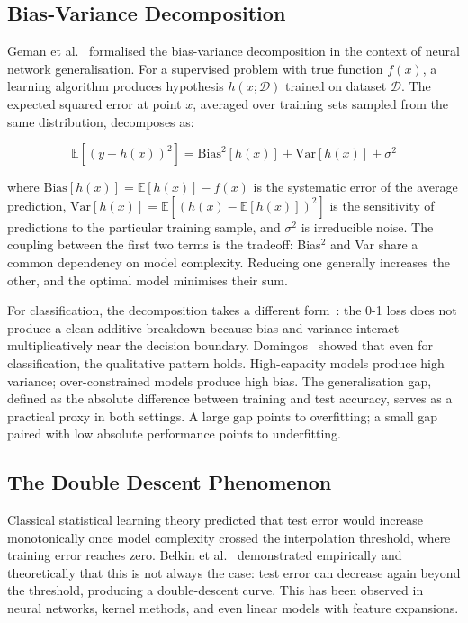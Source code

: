 \documentclass[conference]{IEEEtran}
\begin{document}
\subsection{Bias-Variance Decomposition}

Geman et al.~\cite{b1} formalised the bias-variance decomposition in the context of neural network generalisation. For a supervised problem with true function $f(x)$, a learning algorithm produces hypothesis $h(x; \mathcal{D})$ trained on dataset $\mathcal{D}$. The expected squared error at point $x$, averaged over training sets sampled from the same distribution, decomposes as:

\begin{equation}
\mathbb{E}\left[(y - h(x))^2\right] = \text{Bias}^2[h(x)] + \text{Var}[h(x)] + \sigma^2
\end{equation}

where $\text{Bias}[h(x)] = \mathbb{E}[h(x)] - f(x)$ is the systematic error of the average prediction, $\text{Var}[h(x)] = \mathbb{E}[(h(x) - \mathbb{E}[h(x)])^2]$ is the sensitivity of predictions to the particular training sample, and $\sigma^2$ is irreducible noise. The coupling between the first two terms is the tradeoff: Bias$^2$ and Var share a common dependency on model complexity. Reducing one generally increases the other, and the optimal model minimises their sum.

For classification, the decomposition takes a different form~\cite{b2}: the 0-1 loss does not produce a clean additive breakdown because bias and variance interact multiplicatively near the decision boundary. Domingos~\cite{b19} showed that even for classification, the qualitative pattern holds. High-capacity models produce high variance; over-constrained models produce high bias. The generalisation gap, defined as the absolute difference between training and test accuracy, serves as a practical proxy in both settings. A large gap points to overfitting; a small gap paired with low absolute performance points to underfitting.

\subsection{The Double Descent Phenomenon}

Classical statistical learning theory predicted that test error would increase monotonically once model complexity crossed the interpolation threshold, where training error reaches zero. Belkin et al.~\cite{b21} demonstrated empirically and theoretically that this is not always the case: test error can decrease again beyond the threshold, producing a double-descent curve. This has been observed in neural networks, kernel methods, and even linear models with feature expansions.
\end{document}
